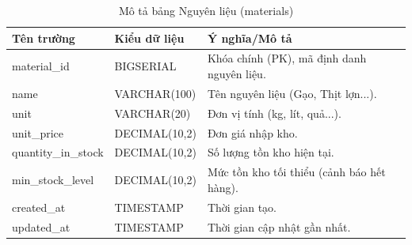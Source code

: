 \documentclass[../20232006p.tex]{subfiles}
\begin{document}
\begin{table}[H]
    \centering
    \caption{Mô tả bảng Nguyên liệu (materials)}
    \label{tab:materials}
    \begin{tabular}{|p{3.5cm}|p{3cm}|p{7.5cm}|}
        \hline
        \textbf{Tên trường} & \textbf{Kiểu dữ liệu} & \textbf{Ý nghĩa/Mô tả}                     \\
        \hline
        material\_id        & BIGSERIAL             & Khóa chính (PK), mã định danh nguyên liệu. \\
        \hline
        name                & VARCHAR(100)          & Tên nguyên liệu (Gạo, Thịt lợn...).        \\
        \hline
        unit                & VARCHAR(20)           & Đơn vị tính (kg, lít, quả...).             \\
        \hline
        unit\_price         & DECIMAL(10,2)         & Đơn giá nhập kho.                          \\
        \hline
        quantity\_in\_stock & DECIMAL(10,2)         & Số lượng tồn kho hiện tại.                 \\
        \hline
        min\_stock\_level   & DECIMAL(10,2)         & Mức tồn kho tối thiểu (cảnh báo hết hàng). \\
        \hline
        created\_at         & TIMESTAMP             & Thời gian tạo.                             \\
        \hline
        updated\_at         & TIMESTAMP             & Thời gian cập nhật gần nhất.               \\
        \hline
    \end{tabular}
\end{table}
\end{document}
